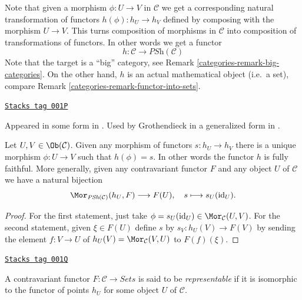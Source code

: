 Note that given a morphism $\phi : U \to V$ in $\mathcal{C}$ we get a
corresponding natural transformation of functors $h(\phi) : h_U \to h_V$
defined by composing with the morphism $U \to V$. This turns
composition of morphisms in $\mathcal{C}$ into composition of
transformations of functors. In other words we get a functor
$$
h :
\mathcal{C}
\longrightarrow
\textit{PSh}(\mathcal{C})
$$
Note that the target is a ``big'' category, see
Remark \ref{categories-remark-big-categories}. On the other hand,
$h$ is an actual mathematical object (i.e.\ a set), compare Remark
\ref{categories-remark-functor-into-sets}.

\begin{lemma}

\label{categories-lemma-yoneda}
\href{https://stacks.math.columbia.edu/tag/001P}{\texttt{Stacks tag 001P}}

\begin{reference}
Appeared in some form in \cite{Yoneda-homology}. Used by Grothendieck in a
generalized form in \cite{Gr-II}.
\end{reference}
Let $U, V \in \Ob(\mathcal{C})$.
Given any morphism of functors $s : h_U \to h_V$
there is a unique morphism $\phi : U \to V$
such that $h(\phi) = s$. In other words the
functor $h$ is fully faithful. More generally,
given any contravariant functor $F$ and any object
$U$ of $\mathcal{C}$ we have a natural bijection
$$
\Mor_{\textit{PSh}(\mathcal{C})}(h_U, F) \longrightarrow F(U),
\quad
s \longmapsto s_U(\text{id}_U).
$$
\end{lemma}

\begin{proof}
For the first statement, just take
$\phi = s_U(\text{id}_U) \in \Mor_\mathcal{C}(U, V)$.
For the second statement, given $\xi \in F(U)$ define
$s$ by $s_V : h_U(V) \to F(V)$ by sending the element $f : V \to U$
of $h_U(V) = \Mor_\mathcal{C}(V, U)$ to $F(f)(\xi)$.
\end{proof}

\begin{definition}
\label{categories-definition-representable-functor}
\href{https://stacks.math.columbia.edu/tag/001Q}{\texttt{Stacks tag 001Q}}

A contravariant functor $F : \mathcal{C}\to \textit{Sets}$ is said
to be {\it representable} if it is isomorphic to the functor of
points $h_U$ for some object $U$ of $\mathcal{C}$.
\end{definition}

